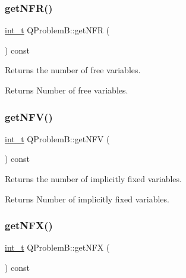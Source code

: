 \subsubsection{\texorpdfstring{get\+N\+F\+R()}{getNFR()}}
{\footnotesize\ttfamily \hyperlink{_types_8hpp_ab6fd6105e64ed14a0c9281326f05e623}{int\+\_\+t} Q\+Problem\+B\+::get\+N\+FR (\begin{DoxyParamCaption}{ }\end{DoxyParamCaption}) const\hspace{0.3cm}{\ttfamily [inline]}}

Returns the number of free variables. \begin{DoxyReturn}{Returns}
Number of free variables. 
\end{DoxyReturn}
\mbox{\label{class_q_problem_b_a6ea3aaec6918af07d0db993aa365a71e}} 
\subsubsection{\texorpdfstring{get\+N\+F\+V()}{getNFV()}}
{\footnotesize\ttfamily \hyperlink{_types_8hpp_ab6fd6105e64ed14a0c9281326f05e623}{int\+\_\+t} Q\+Problem\+B\+::get\+N\+FV (\begin{DoxyParamCaption}{ }\end{DoxyParamCaption}) const\hspace{0.3cm}{\ttfamily [inline]}}

Returns the number of implicitly fixed variables. \begin{DoxyReturn}{Returns}
Number of implicitly fixed variables. 
\end{DoxyReturn}
\mbox{\label{class_q_problem_b_ace4ced063e846e210630f52ae40b32f7}} 
\subsubsection{\texorpdfstring{get\+N\+F\+X()}{getNFX()}}
{\footnotesize\ttfamily \hyperlink{_types_8hpp_ab6fd6105e64ed14a0c9281326f05e623}{int\+\_\+t} Q\+Problem\+B\+::get\+N\+FX (\begin{DoxyParamCaption}{ }\end{DoxyParamCaption}) const\hspace{0.3cm}{\ttfamily [inline]}}

